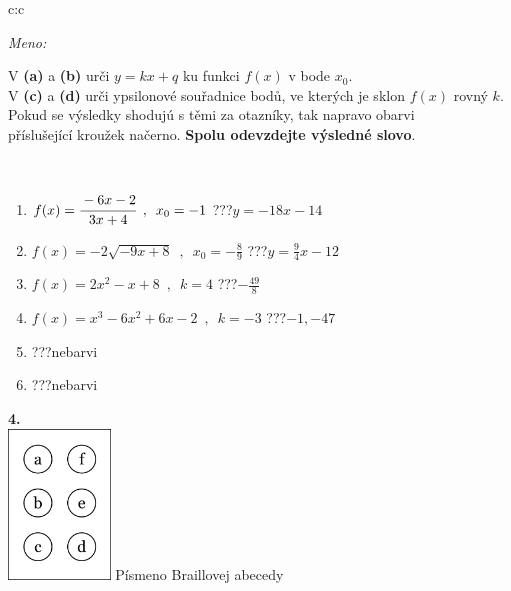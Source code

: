 \documentclass[10pt]{report}
\begin{document}
\begin{tabular}{c:c}
\begin{minipage}[c][104.5mm][t]{0.5\linewidth}
\begin{center}
\textit{Meno:}\phantom{xxxxxxxxxxxxxxxxxxxxxxxxxxxxxxxxxxxxxxxxxxxxxxxxxxxxxxxxxxxxxxxxx}\\[5mm]
\begin{minipage}{0.95\linewidth}
\begin{center}
V \textbf{(a)} a \textbf{(b)} urči  $y = kx + q$ ku funkci $f(x)$ v bode $x_0$.\\V \textbf{(c)} a \textbf{(d)} urči ypsilonové souřadnice bodů, ve kterých je sklon $f(x)$ rovný $k$.\\Pokud se výsledky shodujú s těmi za otazníky, tak napravo obarvi\\příslušející kroužek načerno. \textbf{Spolu odevzdejte výsledné slovo}.
\end{center}
\end{minipage}
\\[1mm]
\begin{minipage}{0.79\linewidth}
\begin{center}
\begin{varwidth}{\linewidth}
\begin{enumerate}
\small
\item $f(x)=\cfrac{-6x-2}{3x+4}\enspace , \enspace x_0=-1$\quad \dotfill\; ???\;\dotfill \quad $y = -18x-14$
\item $f(x)=-2\sqrt{-9x+8}\enspace , \enspace x_0=-\frac{8}{9}$\quad \dotfill\; ???\;\dotfill \quad $y = \frac{9}{4}x-12$
\item $f(x)=2x^2-x+8\enspace , \enspace k=4$\quad \dotfill\; ???\;\dotfill \quad $-\frac{49}{8}$
\item $f(x)=x^3-6x^2+6x-2\enspace , \enspace k=-3$\quad \dotfill\; ???\;\dotfill \quad $-1 , -47$
\item \quad \dotfill\; ???\;\dotfill \quad nebarvi
\item \quad \dotfill\; ???\;\dotfill \quad nebarvi
\end{enumerate}
\end{varwidth}
\end{center}
\end{minipage}
\begin{minipage}{0.20\linewidth}
\begin{center}
{\Huge\bfseries 4.} \\[2mm]
\includegraphics[height=40mm]{../images/braille.png}
{\small Písmeno Braillovej abecedy}
\end{center}
\end{minipage}
\end{center}
\end{minipage}
%
\end{tabular}
\end{document}
